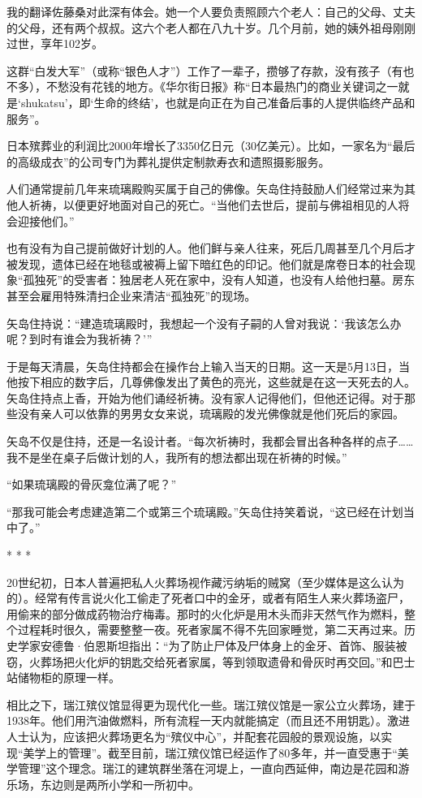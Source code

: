 \documentclass[12pt,oneside]{book}
\begin{document}
我的翻译佐藤桑对此深有体会。她一个人要负责照顾六个老人：自己的父母、丈夫的父母，还有两个叔叔。这六个老人都在八九十岁。几个月前，她的姨外祖母刚刚过世，享年102岁。

这群“白发大军”（或称“银色人才”）工作了一辈子，攒够了存款，没有孩子（有也不多），不愁没有花钱的地方。《华尔街日报》称“日本最热门的商业关键词之一就是‘shukatsu’，即‘生命的终结’，也就是向正在为自己准备后事的人提供临终产品和服务”。

日本殡葬业的利润比2000年增长了3350亿日元（30亿美元）。比如，一家名为“最后的高级成衣”的公司专门为葬礼提供定制款寿衣和遗照摄影服务。

人们通常提前几年来琉璃殿购买属于自己的佛像。矢岛住持鼓励人们经常过来为其他人祈祷，以便更好地面对自己的死亡。“当他们去世后，提前与佛祖相见的人将会迎接他们。”

也有没有为自己提前做好计划的人。他们鲜与亲人往来，死后几周甚至几个月后才被发现，遗体已经在地毯或被褥上留下暗红色的印记。他们就是席卷日本的社会现象“孤独死”的受害者：独居老人死在家中，没有人知道，也没有人给他扫墓。房东甚至会雇用特殊清扫企业来清洁“孤独死”的现场。

矢岛住持说：“建造琉璃殿时，我想起一个没有子嗣的人曾对我说：‘我该怎么办呢？到时有谁会为我祈祷？’”

于是每天清晨，矢岛住持都会在操作台上输入当天的日期。这一天是5月13日，当他按下相应的数字后，几尊佛像发出了黄色的亮光，这些就是在这一天死去的人。矢岛住持点上香，开始为他们诵经祈祷。没有家人记得他们，但他还记得。对于那些没有亲人可以依靠的男男女女来说，琉璃殿的发光佛像就是他们死后的家园。

矢岛不仅是住持，还是一名设计者。“每次祈祷时，我都会冒出各种各样的点子……我不是坐在桌子后做计划的人，我所有的想法都出现在祈祷的时候。”

“如果琉璃殿的骨灰龛位满了呢？”

“那我可能会考虑建造第二个或第三个琉璃殿。”矢岛住持笑着说，“这已经在计划当中了。”
\begin{center}
* * *
\end{center}

20世纪初，日本人普遍把私人火葬场视作藏污纳垢的贼窝（至少媒体是这么认为的）。经常有传言说火化工偷走了死者口中的金牙，或者有陌生人来火葬场盗尸，用偷来的部分做成药物治疗梅毒。那时的火化炉是用木头而非天然气作为燃料，整个过程耗时很久，需要整整一夜。死者家属不得不先回家睡觉，第二天再过来。历史学家安德鲁·伯恩斯坦指出：“为了防止尸体及尸体身上的金牙、首饰、服装被窃，火葬场把火化炉的钥匙交给死者家属，等到领取遗骨和骨灰时再交回。”和巴士站储物柜的原理一样。

相比之下，瑞江殡仪馆显得更为现代化一些。瑞江殡仪馆是一家公立火葬场，建于1938年。他们用汽油做燃料，所有流程一天内就能搞定（而且还不用钥匙）。激进人士认为，应该把火葬场更名为“殡仪中心”，并配套花园般的景观设施，以实现“美学上的管理”。截至目前，瑞江殡仪馆已经运作了80多年，并一直受惠于“美学管理”这个理念。瑞江的建筑群坐落在河堤上，一直向西延伸，南边是花园和游乐场，东边则是两所小学和一所初中。
\end{document}
